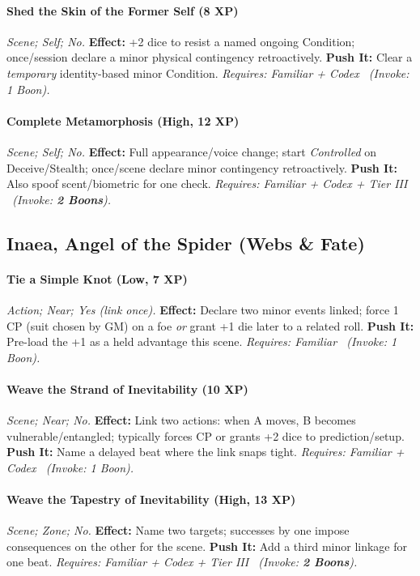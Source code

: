 \documentclass[12pt,twoside]{book}
\begin{document}
\paragraph{Shed the Skin of the Former Self (8 XP)} \emph{Scene; Self; No.}
\textbf{Effect:} +2 dice to resist a named ongoing Condition; once/session declare a minor physical contingency retroactively.
\textbf{Push It:} Clear a \emph{temporary} identity-based minor Condition.
\emph{Requires: Familiar + Codex \ (\textit{Invoke:} 1 Boon).}
\paragraph{Complete Metamorphosis (High, 12 XP)} \emph{Scene; Self; No.}
\textbf{Effect:} Full appearance/voice change; start \emph{Controlled} on Deceive/Stealth; once/scene declare minor contingency retroactively.
\textbf{Push It:} Also spoof scent/biometric for one check.
\emph{Requires: Familiar + Codex + Tier III \ (\textit{Invoke:} \textbf{2 Boons}).}

\subsection{Inaea, Angel of the Spider (Webs \& Fate)}
\paragraph{Tie a Simple Knot (Low, 7 XP)} \emph{Action; Near; Yes (link once).}
\textbf{Effect:} Declare two minor events linked; force 1 CP (suit chosen by GM) on a foe \emph{or} grant +1 die later to a related roll.
\textbf{Push It:} Pre-load the +1 as a held advantage this scene.
\emph{Requires: Familiar \ (\textit{Invoke:} 1 Boon).}
\paragraph{Weave the Strand of Inevitability (10 XP)} \emph{Scene; Near; No.}
\textbf{Effect:} Link two actions: when A moves, B becomes vulnerable/entangled; typically forces CP or grants +2 dice to prediction/setup.
\textbf{Push It:} Name a delayed beat where the link snaps tight.
\emph{Requires: Familiar + Codex \ (\textit{Invoke:} 1 Boon).}
\paragraph{Weave the Tapestry of Inevitability (High, 13 XP)} \emph{Scene; Zone; No.}
\textbf{Effect:} Name two targets; successes by one impose consequences on the other for the scene.
\textbf{Push It:} Add a third minor linkage for one beat.
\emph{Requires: Familiar + Codex + Tier III \ (\textit{Invoke:} \textbf{2 Boons}).}
\end{document}
